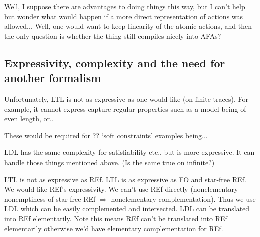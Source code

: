 Well, I suppose there are advantages to doing things this way, but I can't help but wonder
what would happen if a more direct representation of actions was allowed...
Well, one would want to keep linearity of the atomic actions,
and then the only question is whether the thing still compiles nicely into AFAs?

\subsection{Expressivity, complexity and the need for another formalism}

Unfortunately, LTL is not as expressive as one would like (on finite traces). For example, it cannot express capture regular properties such as a model being of even length, or..

These would be required for ?? `soft constraints'
examples being...

LDL has the same complexity for satisfiability etc., but is more expressive. It can handle those things mentioned above. (Is the same true on infinite?)

LTL is not as expressive as REf.
LTL is as expressive as FO and star-free REf.
We would like REf's expressivity.
We can't use REf directly (nonelementary nonemptiness of star-free REf $\Rightarrow$ nonelementary complementation).
Thus we use LDL which can be easily complemented and intersected.
LDL can be translated into REf elementarily.
Note this means REf can't be translated into REf elementarily otherwise we'd have elementary complementation for REf.
